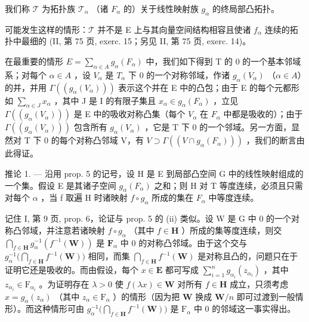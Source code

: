 我们称 \(\mathcal{T}\) 为拓扑族 \(\mathcal{T}_{\alpha}\) （诸 \(F_{\alpha}\) 的）关于线性映射族 \(g_{\alpha}\) 的终局部凸拓扑。

可能发生这样的情形：\(\mathcal{T}\) 并不是 E 上与其向量空间结构相容且使诸 \(f_{\alpha}\) 连续的拓扑中最细的 (II, 第 75 页, exerc. 15；另见 II, 第 75 页, exerc. 14)。

在最重要的情形 \(E = \sum_{\alpha \in A} g_{\alpha}(F_{\alpha})\) 中，我们如下得到 T 的 0 的一个基本邻域系；对每个 \(\alpha \in A\) ，设 \(V_{\alpha}\) 是 \(T_{\alpha}\) 下 0 的一个对称邻域，作诸 \(g_{\alpha}(V_{\alpha})\) （\(\alpha \in A\)）的并，并用 \(\Gamma((g_{\alpha}(V_{\alpha})))\) 表示这个并在 E 中的凸包；由于 E 的每个元都形如 \(\sum_{\alpha \in J} x_{\alpha}\) ，其中 J 是 I 的有限子集且 \(x_{\alpha} \in g_{\alpha}(F_{\alpha})\) ，立见 \(\Gamma((g_{\alpha}(V_{\alpha})))\) 是 E 中的吸收对称凸集（每个 \(V_{\alpha}\) 在 \(F_{\alpha}\) 中都是吸收的）；由于 \(\Gamma((g_{\alpha}(V_{\alpha})))\) 包含所有 \(g_{\alpha}(V_{\alpha})\) ，它是 T 下 0 的一个邻域。另一方面，显然对 T 下 0 的每个对称凸邻域 V，有 \(V \supset \Gamma((V \cap g_{\alpha}(F_{\alpha})))\) ，我们的断言由此得证。

推论 1. --- 沿用 prop. 5 的记号，设 H 是 E 到局部凸空间 G 中的线性映射组成的一个集。假设 E 是其诸子空间 \(g_{\alpha}(F_{\alpha})\) 之和；则 H 对 T 等度连续，必须且只需对每个 \(\alpha\) ，当 f 取遍 H 时诸映射 \(f \circ g_{\alpha}\) 所成的集在 \(F_{\alpha}\) 中等度连续。

记住 I, 第 9 页, prop. 6，论证与 prop. 5 的 (ii) 类似。设 W 是 G 中 0 的一个对称凸邻域，并注意若诸映射 \(f \circ g_{\alpha}\) （其中 \(f \in \mathbf{H}\) ）所成的集等度连续，则交 \(\bigcap_{f \in \mathbf{H}} g_{\alpha}^{-1}(f^{-1}(\mathbf{W}))\) 是 \(\mathbf{F}_{\alpha}\) 中 0 的对称凸邻域。由于这个交与 \(g_{\alpha}^{-1}\big(\bigcap_{f \in \mathbf{H}} f^{-1}(\mathbf{W})\big)\) 相同，而集 \(\bigcap_{f \in \mathbf{H}} f^{-1}(\mathbf{W})\) 是对称且凸的，问题只在于证明它还是吸收的。而由假设，每个 \(x \in \mathbf{E}\) 都可写成 \(\sum_{i=1}^{n} g_{\alpha_i}(z_{\alpha_i})\) ，其中 \(z_{\alpha_i} \in \mathrm{F}_{\alpha_i}\) 。为证明存在 \(\lambda > 0\) 使 \(f(\lambda x) \in \mathbf{W}\) 对所有 \(f \in \mathbf{H}\) 成立，只须考虑 \(x = g_{\alpha}(z_{\alpha})\) （其中 \(z_{\alpha} \in \mathrm{F}_{\alpha}\) ）的情形（因为把 \(\mathbf{W}\) 换成 \(\mathbf{W}/n\) 即可过渡到一般情形）。而这种情形可由 \(g_{\alpha}^{-1}\big(\bigcap_{f \in \mathbf{H}} f^{-1}(\mathbf{W})\big)\) 是 \(\mathrm{F}_{\alpha}\) 中 0 的邻域这一事实得出。

